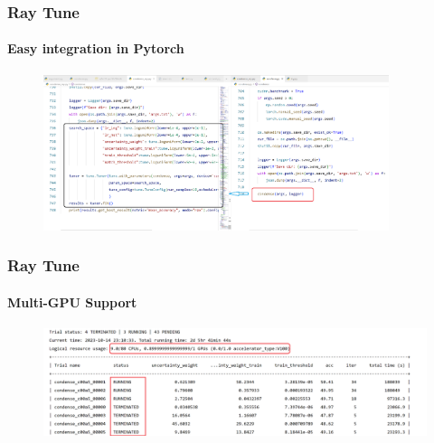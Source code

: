 \documentclass{beamer}
\begin{document}
\begin{frame}
\frametitle{Ray Tune}
\framesubtitle{Easy integration in Pytorch}
		\begin{figure}
			\centering
			\includegraphics[width=0.9\textwidth]
			{assets/code2}
		\end{figure}
\end{frame}

\begin{frame}
\frametitle{Ray Tune}
\framesubtitle{Multi-GPU Support}
		\begin{figure}
			\centering
			\includegraphics[width=1\textwidth]
			{assets/GPU_use}
		\end{figure}
\end{frame}




\backmatter
\end{document}

